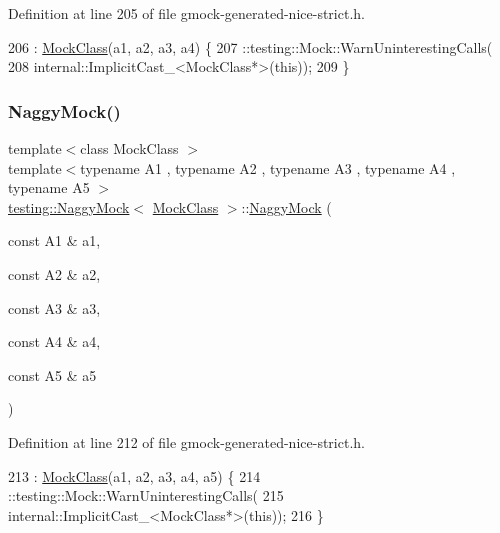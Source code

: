 Definition at line 205 of file gmock-\/generated-\/nice-\/strict.\+h.


\begin{DoxyCode}
206                     : \hyperlink{classMockClass}{MockClass}(a1, a2, a3, a4) \{
207     ::testing::Mock::WarnUninterestingCalls(
208         internal::ImplicitCast\_<MockClass*>(\textcolor{keyword}{this}));
209   \}
\end{DoxyCode}
\mbox{\label{classtesting_1_1NaggyMock_ac751c8a708935bd8558c9665160f7144}} 
\subsubsection{\texorpdfstring{Naggy\+Mock()}{NaggyMock()}\hspace{0.1cm}{\footnotesize\ttfamily [6/11]}}
{\footnotesize\ttfamily template$<$class Mock\+Class $>$ \\
template$<$typename A1 , typename A2 , typename A3 , typename A4 , typename A5 $>$ \\
\hyperlink{classtesting_1_1NaggyMock}{testing\+::\+Naggy\+Mock}$<$ \hyperlink{classMockClass}{Mock\+Class} $>$\+::\hyperlink{classtesting_1_1NaggyMock}{Naggy\+Mock} (\begin{DoxyParamCaption}\item[{const A1 \&}]{a1,  }\item[{const A2 \&}]{a2,  }\item[{const A3 \&}]{a3,  }\item[{const A4 \&}]{a4,  }\item[{const A5 \&}]{a5 }\end{DoxyParamCaption})\hspace{0.3cm}{\ttfamily [inline]}}



Definition at line 212 of file gmock-\/generated-\/nice-\/strict.\+h.


\begin{DoxyCode}
213                     : \hyperlink{classMockClass}{MockClass}(a1, a2, a3, a4, a5) \{
214     ::testing::Mock::WarnUninterestingCalls(
215         internal::ImplicitCast\_<MockClass*>(\textcolor{keyword}{this}));
216   \}
\end{DoxyCode}
\mbox{\label{classtesting_1_1NaggyMock_aac4c0986e917a5d6e515f8dc0e7bf644}} 
